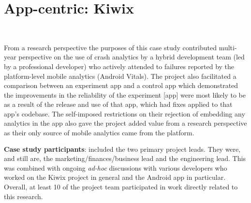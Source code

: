 \clearpage


\section{App-centric: Kiwix}~\label{case-study-overview-kiwix}

From a research perspective the purposes of this case study contributed multi-year perspective on the use of crash analytics by a hybrid development team (led by a professional developer) who actively attended to failures reported by the platform-level mobile analytics (Android Vitals). The project also facilitated a comparison between an experiment app and a control app which demonstrated the improvements in the reliability of the experiment [app] were most likely to be as a result of the release and use of that app, which had fixes applied to that app's codebase. The self-imposed restrictions on their rejection of embedding any analytics in the app also gave the project added value from a research perspective as their only source of mobile analytics came from the platform. 

\textbf{Case study participants}: included the two primary project leads. They were, and still are, the marketing/finances/business lead and the engineering lead. This was combined with ongoing \emph{ad-hoc} discussions with various developers who worked on the Kiwix project in general and the Android app in particular. Overall, at least 10 of the project team participated in work directly related to this research.
    
